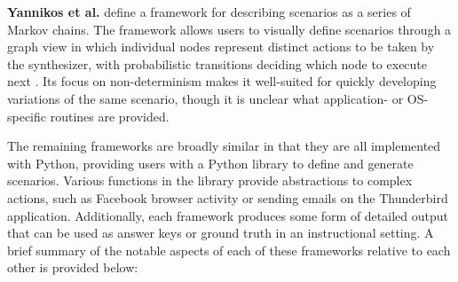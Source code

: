 \documentclass[letterpaper,12pt]{report}
\begin{document}
\textbf{Yannikos et al.} define a framework for describing scenarios as
a series of Markov chains. The framework allows users to visually define
scenarios through a graph view in which individual nodes represent
distinct actions to be taken by the synthesizer, with probabilistic
transitions deciding which node to execute next
\cite{yannikosDataCorporaDigital2014}. Its focus on non-determinism
makes it well-suited for quickly developing variations of the same
scenario, though it is unclear what application- or OS-specific routines
are provided.

The remaining frameworks are broadly similar in that they are all
implemented with Python, providing users with a Python library to define
and generate scenarios. Various functions in the library provide
abstractions to complex actions, such as Facebook browser activity or
sending emails on the Thunderbird application. Additionally, each
framework produces some form of detailed output that can be used as
answer keys or ground truth in an instructional setting. A brief summary
of the notable aspects of each of these frameworks relative to each
other is provided below:
\end{document}
